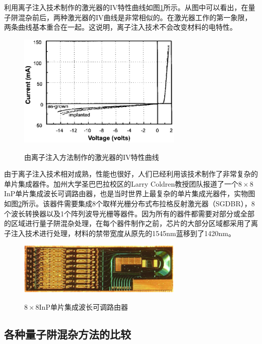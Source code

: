 \documentclass{ZJUthesis}
\begin{document}
利用离子注入技术制作的激光器的IV特性曲线如图\ref{fig_implantation_laser}所示。从图中可以看出，在量子阱混杂前后，两种激光器的IV曲线是非常相似的。在激光器工作的第一象限，两条曲线基本重合在一起。这说明，离子注入技术不会改变材料的电特性。

\begin{figure}[!htb]
  \centering
  \includegraphics[width=0.7\textwidth]{./Pictures/implantation_laser.eps}\\
  \caption{由离子注入方法制作的激光器的IV特性曲线}
  \label{fig_implantation_laser}
\end{figure}

由于离子注入技术相对成熟，性能也很好，人们已经利用该技术制作了非常复杂的单片集成器件。加州大学圣巴巴拉校区的Larry Coldren教授团队报道了一个$8\times8$InP单片集成波长可调路由器\cite{nicholes20108}，也是当时世界上最复杂的单片集成光器件，实物图如图\ref{fig_motor}所示。该器件需要集成8个取样光栅分布式布拉格反射激光器（SGDBR），8个波长转换器以及1个阵列波导光栅等器件。因为所有的器件都需要对部分或全部的区域进行量子阱混杂处理，在每个器件制作之前，芯片的大部分区域都采用了离子注入技术进行处理，材料的禁带宽度从原先的1545nm蓝移到了1420nm。

\begin{figure}[!htb]
  \centering
  \includegraphics[width=0.7\textwidth]{./Pictures/motor.eps}\\
  \caption{$8\times8$InP单片集成波长可调路由器}
  \label{fig_motor}
\end{figure}

\subsection{各种量子阱混杂方法的比较}
\end{document}
